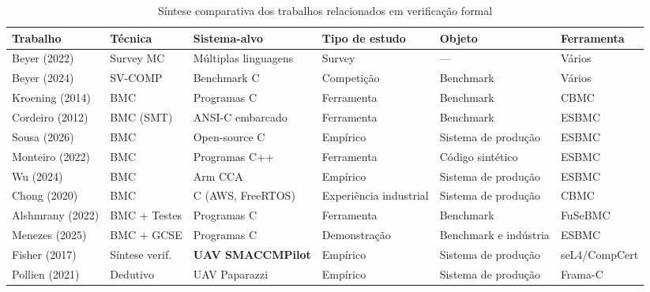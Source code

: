 \begin{table}[p]
\centering
\caption{Síntese comparativa dos trabalhos relacionados em verificação formal}
\label{tab:trabalhos-relacionados}
\scriptsize
\renewcommand{\arraystretch}{0.78}
\setlength{\tabcolsep}{2pt}
\begin{tabular}{|>{\raggedright\arraybackslash}p{2.3cm}|>{\raggedright\arraybackslash}p{2.0cm}|>{\raggedright\arraybackslash}p{2.2cm}|>{\raggedright\arraybackslash}p{1.7cm}|>{\raggedright\arraybackslash}p{2.1cm}|>{\raggedright\arraybackslash}p{1.9cm}|}
\hline
\textbf{Trabalho} & \textbf{Técnica} & \textbf{Sistema-alvo} &
\textbf{Tipo de estudo} & \textbf{Objeto} & \textbf{Ferramenta} \\
\hline
Beyer (2022)        & Survey MC       & Múltiplas linguagens    & Survey     & ---                   & Vários    \\ \hline
Beyer (2024)        & SV-COMP         & Benchmark C             & Competição & Benchmark             & Vários    \\ \hline
Kroening (2014)     & BMC             & Programas C             & Ferramenta & Benchmark             & CBMC      \\ \hline
Cordeiro (2012)     & BMC (SMT)       & ANSI-C embarcado        & Ferramenta & Benchmark             & ESBMC     \\ \hline
Sousa (2026)        & BMC             & Open-source C           & Empírico   & Sistema de produção   & ESBMC     \\ \hline
Monteiro (2022)     & BMC             & Programas C++           & Ferramenta & Código sintético      & ESBMC     \\ \hline
Wu (2024)           & BMC             & Arm CCA                 & Empírico   & Sistema de produção   & ESBMC     \\ \hline
Chong (2020)        & BMC             & C (AWS, FreeRTOS)       & Experiência industrial & Sistema de produção & CBMC \\ \hline
Alshmrany (2022)    & BMC + Testes    & Programas C             & Ferramenta & Benchmark             & FuSeBMC   \\ \hline
Menezes (2025)      & BMC + GCSE      & Programas C             & Demonstração & Benchmark e indústria & ESBMC   \\ \hline
Fisher (2017)       & Síntese verif.  & \textbf{UAV SMACCMPilot}& Empírico   & Sistema de produção   & seL4/CompCert \\ \hline
Pollien (2021)      & Dedutivo        & UAV Paparazzi           & Empírico   & Sistema de produção   & Frama-C   \\ \hline

\end{tabular}
\end{table}
